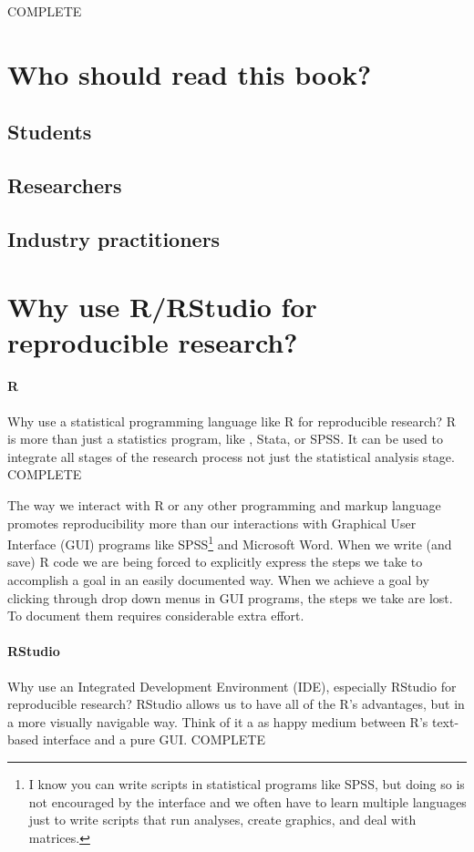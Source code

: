 \documentclass[ChapterTOCs,krantz1]{krantz}\usepackage{graphicx, color}
\begin{document}
COMPLETE

\section{Who should read this book?}

\subsection{Students}

\subsection{Researchers}

\subsection{Industry practitioners}

\section{Why use R/RStudio for reproducible research?}

\paragraph{R}
Why use a statistical programming language like R for reproducible research? R is more than just a statistics program, like , Stata, or SPSS. It can be used to integrate all stages of the research process not just the statistical analysis stage. COMPLETE

The way we interact with R or any other programming and markup language promotes reproducibility more than our interactions with Graphical User Interface (GUI) programs like SPSS\footnote{I know you can write scripts in statistical programs like SPSS, but doing so is not encouraged by the interface and we often have to learn multiple languages just to write scripts that run analyses, create graphics, and deal with matrices.} and Microsoft Word. When we write (and save) R code we are being forced to explicitly express the steps we take to accomplish a goal in an easily documented way. When we achieve a goal by clicking through drop down menus in GUI programs, the steps we take are lost. To document them requires considerable extra effort.

\paragraph{RStudio}
Why use an Integrated Development Environment (IDE), especially RStudio for reproducible research? RStudio allows us to have all of the R's advantages, but in a more visually navigable way. Think of it a as happy medium between R's text-based interface and a pure GUI. COMPLETE
\end{document}
